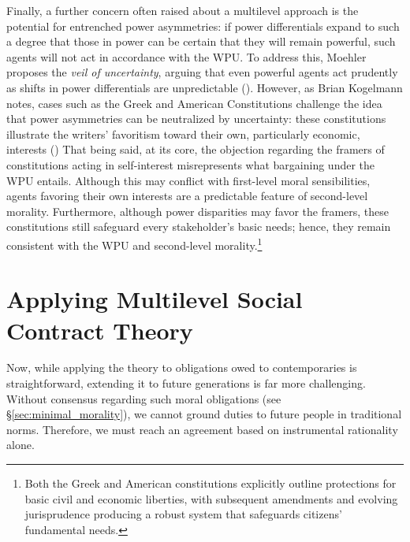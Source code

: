 \documentclass[12pt, a4paper, twoside]{article}
\begin{document}
Finally, a further concern often raised about a multilevel approach is the potential for entrenched power asymmetries: if power differentials expand to such a degree that those in power can be certain that they will remain powerful, such agents will not act in accordance with the WPU. To address this, Moehler proposes the \emph{veil of uncertainty}, arguing that even powerful agents act prudently as shifts in power differentials are unpredictable (\cite[p.\ 144]{moehler2018minimal}). However, as Brian Kogelmann notes, cases such as the Greek and American Constitutions challenge the idea that power asymmetries can be neutralized by uncertainty: these constitutions illustrate the writers’ favoritism toward their own, particularly economic, interests (\cite[p.\ 5–6]{kogelmann2019}) That being said, at its core, the objection regarding the framers of constitutions acting in self-interest misrepresents what bargaining under the WPU entails. Although this may conflict with first-level moral sensibilities, agents favoring their own interests are a predictable feature of second-level morality. Furthermore, although power disparities may favor the framers, these constitutions still safeguard every stakeholder’s basic needs; hence, they remain consistent with the WPU and second-level morality.\footnote{Both the Greek and American constitutions explicitly outline protections for basic civil and economic liberties, with subsequent amendments and evolving jurisprudence producing a robust system that safeguards citizens' fundamental needs.}

\section{Applying Multilevel Social Contract Theory}

Now, while applying the theory to obligations owed to contemporaries is straightforward, extending it to future generations is far more challenging. Without consensus regarding such moral obligations (see §\ref{sec:minimal_morality}), we cannot ground duties to future people in traditional norms. Therefore, we must reach an agreement based on instrumental rationality alone.
\end{document}
